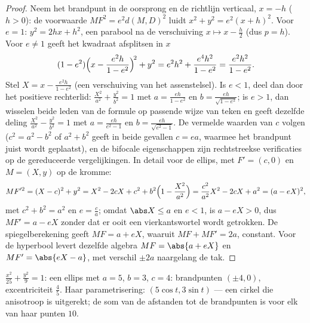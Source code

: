 \begin{proof}
Neem het brandpunt in de oorsprong en de richtlijn verticaal, $x =
-h$ ($h > 0$): de voorwaarde $MF^2 = e^2 d(M, D)^2$ luidt $x^2 + y^2
= e^2 (x + h)^2$. Voor $e = 1$: $y^2 = 2hx + h^2$, een parabool na
de verschuiving $x \mapsto x - \frac h2$ (dus $p = h$). Voor $e \neq
1$ geeft het kwadraat afsplitsen in $x$
\[
(1 - e^2)\Bigl(x - \frac{e^2 h}{1 - e^2}\Bigr)^{\!2} + y^2
= e^2h^2 + \frac{e^4 h^2}{1 - e^2}
= \frac{e^2 h^2}{1 - e^2} .
\]
Stel $X = x - \frac{e^2h}{1-e^2}$ (een verschuiving van het
assenstelsel). Is $e < 1$, deel dan door het positieve rechterlid:
$\frac{X^2}{a^2} + \frac{y^2}{b^2} = 1$ met $a = \frac{eh}{1 -
e^2}$ en $b = \frac{eh}{\sqrt{1-e^2}}$; is $e > 1$, dan wisselen
beide leden van de formule op passende wijze van teken en geeft
dezelfde deling $\frac{X^2}{a^2} - \frac{y^2}{b^2} = 1$ met $a =
\frac{eh}{e^2 - 1}$ en $b = \frac{eh}{\sqrt{e^2 - 1}}$. De vermelde
waarden van $c$ volgen ($c^2 = a^2 - b^2$ of $a^2 + b^2$ geeft in
beide gevallen $c = ea$, waarmee het brandpunt juist wordt
geplaatst), en de bifocale eigenschappen zijn rechtstreekse
verificaties op de gereduceerde vergelijkingen. In detail voor de
ellips, met $F' = (c, 0)$ en $M = (X, y)$ op de kromme:
\[
MF'^2 = (X - c)^2 + y^2
= X^2 - 2cX + c^2 + b^2\Bigl(1 - \frac{X^2}{a^2}\Bigr)
= \frac{c^2}{a^2}X^2 - 2cX + a^2
= (a - eX)^2 ,
\]
met $c^2 + b^2 = a^2$ en $e = \frac ca$; omdat $\abs X \leq a$ en
$e < 1$, is $a - eX > 0$, dus $MF' = a - eX$ zonder dat er ooit een
vierkantswortel wordt getrokken. De spiegelberekening geeft $MF = a
+ eX$, waaruit $MF + MF' = 2a$, constant. Voor de hyperbool levert
dezelfde algebra $MF = \abs{a + eX}$ en $MF' = \abs{eX - a}$, met
verschil $\pm2a$ naargelang de tak.
\end{proof}

\begin{example}\label{ex:b1:curves:conicexample}
$\frac{x^2}{25} + \frac{y^2}{9} = 1$: een ellips met $a = 5$, $b =
3$, $c = 4$: brandpunten $(\pm4, 0)$, excentriciteit $\frac45$. Haar
parametrisering: $(5\cos t, 3\sin t)$ --- een cirkel die
anisotroop is uitgerekt; de som van de afstanden tot de
brandpunten is voor elk van haar punten $10$.
\end{example}

